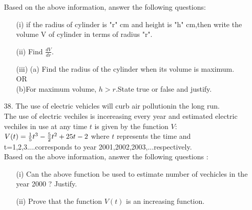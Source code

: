 \documentclass{article}
\begin{document}
\begin{enumerate}
Based on the above information, answer the following questions:
\begin{itemize}
\item [(i)] if the radius of cylinder is "r" cm and height is "h" cm,then write the volume V of cylinder in terms of radius "r".
\item [(ii)] Find $\frac{dV}{dr}$.
\item [(iii)] (a) Find the radius of the cylinder when its volume is maximum.\\
OR\\
(b)For maximum volume, \(h>r\).State true or false and justify.
\end{itemize}
\item [38.] The use of electric vehicles will curb air pollutionin the long run.\\
The use of electric vechiles is incereasing every year and estimated electric vechiles in use at any time \(t\) is given by the function \(V\):\\
$V(t)=\frac{1}{5} t^3-\frac{5}{2}t^2+25t-2\\$
where \(t\) represents the time and t=1,2,3....corresponds to year 2001,2002,2003,...respectively.\\
Based on the above information, answer the following questions :
\begin{itemize}
    \item [(i)] Can the above function be used to estimate number of vechicles in the year 2000 ? Justify.
    \item [(ii)] Prove that the function \(V(t)\) is an increasing function.
    \end{itemize}

\end{enumerate}
\end{document}
